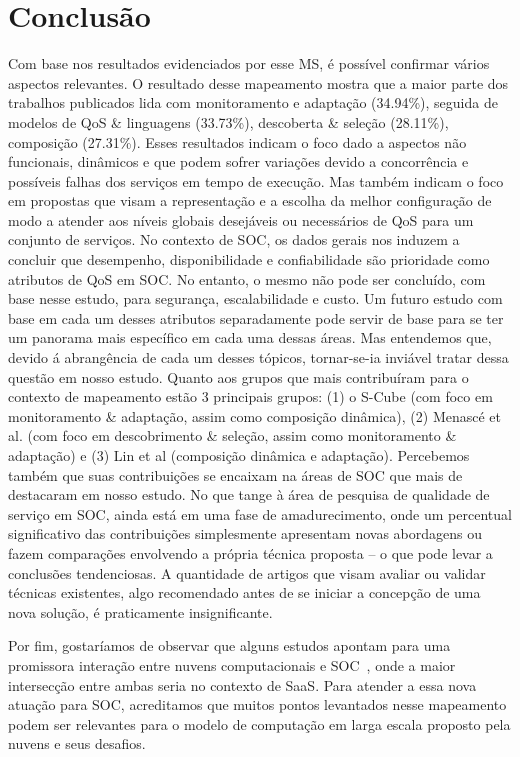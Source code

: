 \section{Conclus\~{a}o}\label{sec:conclusao}

Com base nos resultados evidenciados por esse MS, \'{e} poss\'{i}vel confirmar v\'{a}rios aspectos relevantes. O resultado desse mapeamento mostra que a maior parte dos trabalhos publicados lida com monitoramento e adapta\c{c}\~{a}o (34.94\%), seguida de modelos de QoS \& linguagens (33.73\%), descoberta \& sele\c{c}\~{a}o (28.11\%), composi\c{c}\~{a}o (27.31\%). Esses resultados indicam o foco dado a aspectos n\~{a}o funcionais, din\^{a}micos e que podem sofrer varia\c{c}\~{o}es devido a concorrência e possíveis falhas dos servi\c{c}os em tempo de execu\c{c}\~{a}o. Mas tamb\'{e}m indicam o foco em propostas que visam a representa\c{c}\~{a}o e a escolha da melhor configura\c{c}\~{a}o de modo a atender aos níveis globais desej\'{a}veis ou necess\'{a}rios de QoS para um conjunto de servi\c{c}os. No contexto de SOC, os dados gerais nos induzem a concluir que desempenho, disponibilidade e confiabilidade s\~{a}o prioridade como atributos de QoS em SOC. No entanto, o mesmo n\~{a}o pode ser concluído, com base nesse estudo, para seguran\c{c}a, escalabilidade e custo. Um futuro estudo com base em cada um desses atributos separadamente pode servir de base para se ter um panorama mais espec\'{i}fico em cada uma dessas \'{a}reas. Mas entendemos que, devido \'{a} abrang\^{e}ncia de cada um desses t\'{o}picos, tornar-se-ia invi\'{a}vel tratar dessa quest\~{a}o em nosso estudo. Quanto aos grupos que mais contribu\'{i}ram para o contexto de mapeamento est\~{a}o 3 principais grupos: (1) o S-Cube (com foco em monitoramento \& adapta\c{c}\~{a}o, assim como composi\c{c}\~{a}o din\^{a}mica), (2) Menasc\'{e} et al. (com foco em descobrimento \& sele\c{c}\~{a}o, assim como monitoramento \& adapta\c{c}\~{a}o) e (3) Lin et al (composi\c{c}\~{a}o din\^{a}mica e adapta\c{c}\~{a}o). Percebemos tamb\'{e}m que suas contribui\c{c}\~{o}es se encaixam na \'{a}reas de SOC que mais de destacaram em nosso estudo. No que tange \`{a} \'{a}rea de pesquisa de qualidade de servi\c{c}o em SOC, ainda est\'{a} em uma fase de amadurecimento, onde um percentual significativo das contribui\c{c}\~{o}es simplesmente apresentam novas abordagens ou fazem compara\c{c}\~{o}es envolvendo a própria t\'{e}cnica proposta -- o que pode levar a conclus\~{o}es tendenciosas. A quantidade de artigos que visam avaliar ou validar t\'{e}cnicas existentes, algo recomendado antes de se iniciar a concep\c{c}\~{a}o de uma nova solu\c{c}\~{a}o, \'{e} praticamente insignificante.

Por fim, gostar\'{i}amos de observar que alguns estudos apontam para uma promissora intera\c{c}\~{a}o entre nuvens computacionais e SOC~\cite{10.1109/MIC.2010.147}, onde a maior intersec\c{c}\~{a}o entre ambas seria no contexto de SaaS. Para atender a essa nova atua\c{c}\~{a}o para SOC, acreditamos que muitos pontos levantados nesse mapeamento podem ser relevantes para o modelo de computa\c{c}\~{a}o em larga escala proposto pela nuvens e seus desafios.